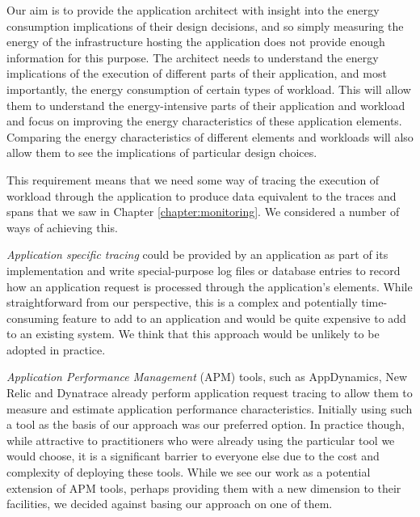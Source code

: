 Our aim is to provide the application architect with insight into the energy consumption implications of their design decisions, and so simply measuring the energy of the infrastructure hosting the application does not provide enough information for this purpose.  The architect needs to understand the energy implications of the execution of different parts of their application, and most importantly, the energy consumption of certain types of workload.  This will allow them to understand the energy-intensive parts of their application and workload and focus on improving the energy characteristics of these application elements.  Comparing the energy characteristics of different elements and workloads will also allow them to see the implications of particular design choices.

This requirement means that we need some way of tracing the execution of workload through the application to produce data equivalent to the traces and spans that we saw in Chapter \ref{chapter:monitoring}.  We considered a number of ways of achieving this.

\emph{Application specific tracing} could be provided by an application as part of its implementation and write special-purpose log files or database entries to record how an application request is processed through the application's elements.  While straightforward from our perspective, this is a complex and potentially time-consuming feature to add to an application and would be quite expensive to add to an existing system.  We think that this approach would be unlikely to be adopted in practice.

\emph{Application Performance Management} (APM) tools, such as AppDynamics, New Relic and Dynatrace \cite{appdynamics2018, newrelic2018, dynatrace2018} already perform application request tracing to allow them to measure and estimate application performance characteristics.  Initially using such a tool as the basis of our approach was our preferred option.  In practice though, while attractive to practitioners who were already using the particular tool we would choose, it is a significant barrier to everyone else due to the cost and complexity of deploying these tools.  While we see our work as a potential extension of APM tools, perhaps providing them with a new dimension to their facilities, we decided against basing our approach on one of them.

